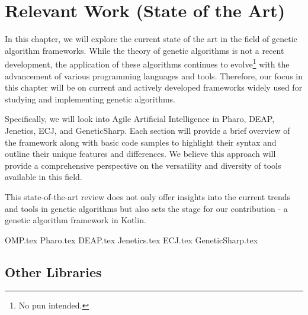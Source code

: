 \chapter{Relevant Work (State of the Art)}
\label{chap:sota}

  In this chapter, we will explore the current state of the art in the field of
  genetic algorithm frameworks.
  While the theory of genetic algorithms is not a recent development, the
  application of these algorithms continues to evolve\footnote{No pun intended.}
  with the advancement of various programming languages and tools.
  Therefore, our focus in this chapter will be on current and actively developed
  frameworks widely used for studying and implementing genetic algorithms.

  Specifically, we will look into Agile Artificial Intelligence in Pharo, DEAP,
  Jenetics, ECJ, and GeneticSharp.
  Each section will provide a brief overview of the framework along with basic
  code samples to highlight their syntax and outline their unique features and
  differences.
  We believe this approach will provide a comprehensive perspective on the
  versatility and diversity of tools available in this field.

  This state-of-the-art review does not only offer insights into the current
  trends and tools in genetic algorithms but also sets the stage for our
  contribution - a genetic algorithm framework in Kotlin.

  {OMP.tex}
  {Pharo.tex}
  {DEAP.tex}
  {Jenetics.tex}
  {ECJ.tex}
  {GeneticSharp.tex}
  \section{Other Libraries}
  \label{sec:sota:other}
    \Blindtext
